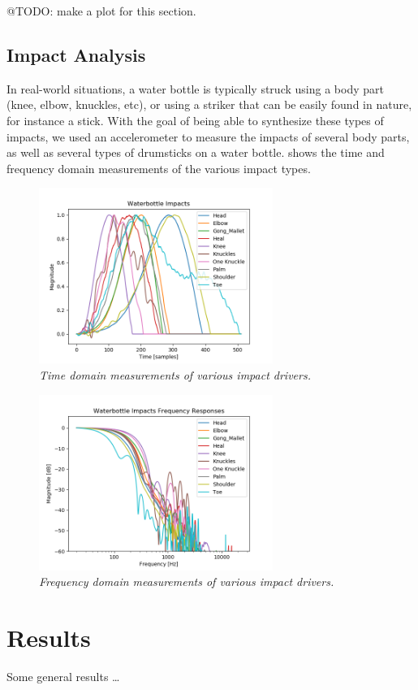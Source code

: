 \documentclass[twoside,a4paper]{article}
\begin{document}
@TODO: make a plot for this section.
%
\subsection{Impact Analysis} \label{sec:impact}
%
In real-world situations, a water bottle is typically struck using a body part
(knee, elbow, knuckles, etc), or using a striker that can be easily found in
nature, for instance a stick. With the goal of being able to synthesize these
types of impacts, we used an accelerometer to measure the impacts of
several body parts, as well as several types of drumsticks on a water bottle.
 shows the time and frequency domain
measurements of the various impact types.
\begin{figure}
    \centering
    \includegraphics[width=3in]{../Figures/Impacts_time}
    \caption{\it{Time domain measurements of various impact drivers.}}
    \label{fig:impact-time}
\end{figure}
\begin{figure}
    \centering
    \includegraphics[width=3in]{../Figures/Impacts_freq}
    \caption{\it{Frequency domain measurements of various impact drivers.}}
    \label{fig:impact-freq}
\end{figure}


\section{Results} \label{sec:results}
%
Some general results \dots
%
\end{document}
